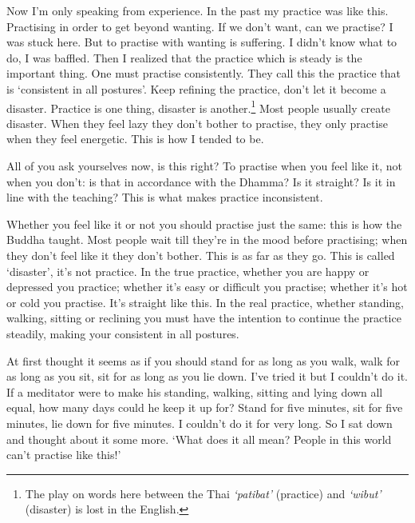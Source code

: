 Now I'm only speaking from experience. In the past my practice was like this. Practising in order to get beyond wanting. If we don't want, can we practise? I was stuck here. But to practise with wanting is suffering. I didn't know what to do, I was baffled. Then I realized that the practice which is steady is the important thing. One must practise consistently. They call this the practice that is `consistent in all postures'. Keep refining the practice, don't let it become a disaster. Practice is one thing, disaster is another.\footnote{The play on words here between the Thai \textit{`patibat'} (practice) and \textit{`wibut'} (disaster) is lost in the English.} Most people usually create disaster. When they feel lazy they don't bother to practise, they only practise when they feel energetic. This is how I tended to be.

All of you ask yourselves now, is this right? To practise when you feel like it, not when you don't: is that in accordance with the Dhamma? Is it straight? Is it in line with the teaching? This is what makes practice inconsistent.

Whether you feel like it or not you should practise just the same: this is how the Buddha taught. Most people wait till they're in the mood before practising; when they don't feel like it they don't bother. This is as far as they go. This is called `disaster', it's not practice. In the true practice, whether you are happy or depressed you practice; whether it's easy or difficult you practise; whether it's hot or cold you practise. It's straight like this. In the real practice, whether standing, walking, sitting or reclining you must have the intention to continue the practice steadily, making your  consistent in all postures.

At first thought it seems as if you should stand for as long as you walk, walk for as long as you sit, sit for as long as you lie down. I've tried it but I couldn't do it. If a meditator were to make his standing, walking, sitting and lying down all equal, how many days could he keep it up for? Stand for five minutes, sit for five minutes, lie down for five minutes. I couldn't do it for very long. So I sat down and thought about it some more. `What does it all mean? People in this world can't practise like this!'

